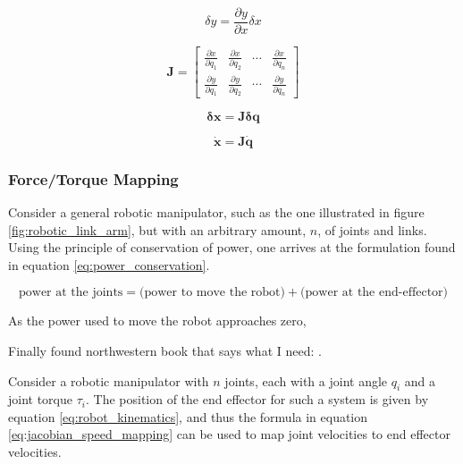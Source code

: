 \begin{equation}
    \label{eq:infinitesimal_change}
    \delta  y = \frac{\partial y}{\partial x} \delta x
\end{equation}

\begin{equation}
    \label{eq:jacobian}
    \mathbf{J} = \begin{bmatrix}
        \frac{\partial x}{\partial q_1} & \frac{\partial x}{\partial q_2} & \cdots & \frac{\partial x}{\partial q_n} \\
        \frac{\partial y}{\partial q_1} & \frac{\partial y}{\partial q_2} & \cdots & \frac{\partial y}{\partial q_n}
    \end{bmatrix}
\end{equation}

\begin{equation}
    \label{eq:jacobian_pos_mapping}
    \mathbf{\delta x} = \mathbf{J}\mathbf{\delta q}
\end{equation}

\begin{equation}
    \label{eq:jacobian_speed_mapping}
    \mathbf{\dot x} = \mathbf{J}\mathbf{\dot q}
\end{equation}

    \subsubsection{Force/Torque Mapping}
    \label{sec:force_torque_mapping}

    Consider a general robotic manipulator, such as the one illustrated in figure \ref{fig:robotic_link_arm}, but with an arbitrary amount, $n$, of joints and links. Using the principle of conservation of power, one arrives at the formulation found in equation \ref{eq:power_conservation}.

    \begin{equation}
        \text{power at the joints} = \text{(power to move the robot)} + \text{(power at the end-effector)}
        \label{eq:power_conservation}
    \end{equation}
    
    As the power used to move the robot approaches zero, 

    Finally found northwestern book that says what I need: \cite{modern_robotics_book}. 

    Consider a robotic manipulator with $n$ joints, each with a joint angle $q_i$ and a joint torque $\tau_i$. The position of the end effector for such a system is given by equation \ref{eq:robot_kinematics}, and thus the formula in equation \ref{eq:jacobian_speed_mapping} can be used to map joint velocities to end effector velocities. 

